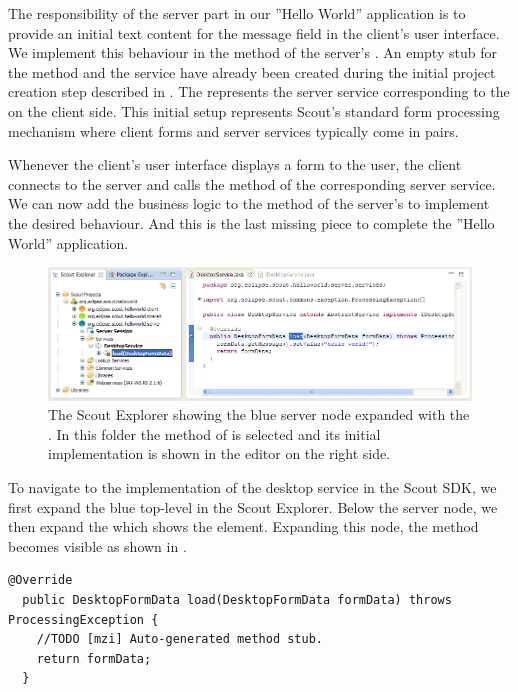 \documentclass[a4paper,10pt,twoside]{book}
\begin{document}
The responsibility of the server part in our ''Hello World'' application is to provide an initial text content for the message field in the client's user interface.
We implement this behaviour in the  method of the server's .
An empty stub for the  method and the  service have already been created during the initial project creation step described in .
The  represents the server service corresponding to the  on the client side.
This initial setup represents Scout's standard form processing mechanism where client forms and server services typically come in pairs.

Whenever the client's user interface displays a form to the user, the client connects to the server and calls the  method of the corresponding server service.
We can now add the business logic to the  method of the server's  to implement the desired behaviour.
And this is the last missing piece to complete the ''Hello World'' application.

\begin{figure}
\includegraphics[width=14cm]{sdk_server_desktopservice_load.png}
\caption{The Scout Explorer showing the blue server node expanded with the .
In this folder the  method of  is selected and its initial implementation is shown in the editor on the right side.}
\end{figure}

To navigate to the implementation of the desktop service in the Scout SDK, we first expand the blue top-level  in the Scout Explorer.
Below the server node, we then expand the  which shows the  element.
Expanding this  node, the  method becomes visible as shown in .

\begin{lstlisting}[backgroundcolor=\color{white}]
  @Override
  public DesktopFormData load(DesktopFormData formData) throws ProcessingException {
    //TODO [mzi] Auto-generated method stub.
    return formData;
  }
\end{lstlisting}
  
\end{document}
